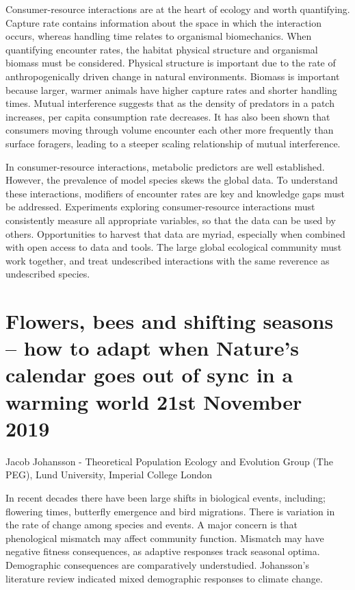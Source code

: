 \documentclass{article}
\begin{document}
\noindent Consumer-resource interactions are at the heart of ecology and worth quantifying. Capture rate contains information about the space in which the interaction occurs, whereas handling time relates to organismal biomechanics. When quantifying encounter rates, the habitat physical structure and organismal biomass must be considered. Physical structure is important due to the rate of anthropogenically driven change in natural environments. Biomass is important because larger, warmer animals have higher capture rates and shorter handling times. Mutual interference suggests that as the density of predators in a patch increases, per capita consumption rate decreases. It has also been shown that consumers moving through volume encounter each other more frequently than surface foragers, leading to a steeper scaling relationship of mutual interference.\bigskip

\noindent In consumer-resource interactions, metabolic predictors are well established. However, the prevalence of model species skews the global data. To understand these interactions, modifiers of encounter rates are key and knowledge gaps must be addressed. Experiments exploring consumer-resource interactions must consistently measure all appropriate variables, so that the data can be used by others. Opportunities to harvest that data are myriad, especially when combined with open access to data and tools. The large global ecological community must work together, and treat undescribed interactions with the same reverence as undescribed species. 

\section{Flowers, bees and shifting seasons – how to adapt when Nature’s calendar goes out of sync in a warming world 21st November 2019}

Jacob Johansson - Theoretical Population Ecology and Evolution Group (The PEG), Lund University, Imperial College London \bigskip
  
\noindent In recent decades there have been large shifts in biological events, including; flowering times, butterfly emergence and bird migrations. There is variation in the rate of change among species and events. A major concern is that phenological mismatch may affect community function. Mismatch may have negative fitness consequences, as adaptive responses track seasonal optima. Demographic consequences are comparatively understudied. Johansson's literature review indicated mixed demographic responses to climate change. \bigskip
\end{document}
